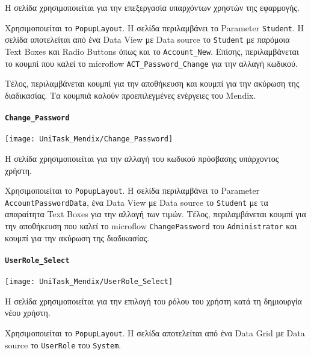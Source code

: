                     Η σελίδα χρησιμοποιείται για την επεξεργασία υπαρχόντων χρηστών της εφαρμογής.

                    Χρησιμοποιείται το \texttt{PopupLayout}. Η σελίδα περιλαμβάνει το Parameter \texttt{Student}. Η σελίδα αποτελείται από ένα Data View με Data source το \texttt{Student} με παρόμοια Text Boxes και Radio Buttons όπως και το \texttt{Account\_New}. Επίσης, περιλαμβάνεται το κουμπί που καλεί το microflow \texttt{ACT\_Password\_Change} για την αλλαγή κωδικού.

                    Τέλος, περιλαμβάνεται κουμπί για την αποθήκευση και κουμπί για την ακύρωση της διαδικασίας. Τα κουμπιά καλούν προεπιλεγμένες ενέργειες του Mendix.

                \paragraph{\texttt{Change\_Password}}
                    \begin{center}
                        \texttt{[image: UniTask\_Mendix/Change\_Password]}
                    \end{center}

                    Η σελίδα χρησιμοποιείται για την αλλαγή του κωδικού πρόσβασης υπάρχοντος χρήστη.

                    Χρησιμοποιείται το \texttt{PopupLayout}. Η σελίδα περιλαμβάνει το Parameter \linebreak \texttt{AccountPasswordData}, ένα Data View με Data source το \texttt{Student} με τα απαραίτητα Text Boxes για την αλλαγή των τιμών. Τέλος, περιλαμβάνεται κουμπί για την αποθήκευση που καλεί το microflow \texttt{ChangePassword} του \texttt{Administrator} και κουμπί για την ακύρωση της διαδικασίας.

                \paragraph{\texttt{UserRole\_Select}}
                    \begin{center}
                        \texttt{[image: UniTask\_Mendix/UserRole\_Select]}
                    \end{center}

                    Η σελίδα χρησιμοποιείται για την επιλογή του ρόλου του χρήστη κατά τη δημιουργία νέου χρήστη.

                    Χρησιμοποιείται το \texttt{PopupLayout}. Η σελίδα αποτελείται από ένα Data Grid με Data source το \texttt{UserRole} του \texttt{System}.

